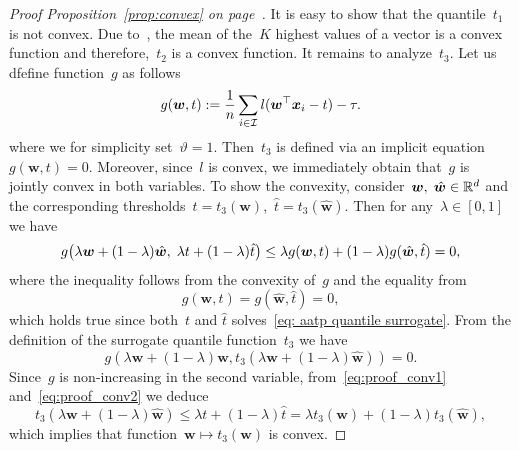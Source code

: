 \propconvex*
\begin{proof}[Proof Proposition~\ref{prop:convex} on page~\pageref{prop:convex}]
  It is easy to show that the quantile~$t_1$ is not convex. Due to~\cite{lapin2015top}, the mean of the~$K$ highest values of a vector is a convex function and therefore,~$t_2$ is a convex function. It remains to analyze~$t_3$. Let us dfefine function~$g$ as follows
  \begin{equation*}
    g(\bm{w},t) := \frac{1}{n} \sum_{i \in \mathcal{I}} l(\bm{w}^\top \bm{x}_i - t) - \tau.
  \end{equation*}
  where we for simplicity set~$\vartheta = 1.$ Then~$t_3$ is defined via an implicit equation~$g(\bm{w},t) = 0.$ Moreover, since~$l$ is convex, we immediately obtain that~$g$ is jointly convex in both variables. To show the convexity, consider~$\bm{w}, \; \hat{\bm{w}} \in \mathbb{R}^d$ and the corresponding thresholds~$t = t_3(\bm{w})$,~$\hat{t} = t_3(\hat{\bm{w}})$. Then for any~$\lambda\in[0,1]$ we have 
  \begin{equation}\label{eq:proof_conv1}
    g\Brac{\lambda \bm{w} + (1 - \lambda)\hat{\bm{w}}, \;\lambda t + (1 - \lambda)\hat{t}}
    \le \lambda g(\bm{w}, t) + (1 - \lambda) g(\hat{\bm{w}}, \hat{t}) = 0,
  \end{equation}
  where the inequality follows from the convexity of~$g$ and the equality from
  \begin{equation*}
    g(\bm{w}, t) = g(\hat{\bm{w}}, \hat{t}) = 0,
  \end{equation*}
  which holds true since both~$t$ and $\hat{t}$ solves~\eqref{eq: aatp quantile surrogate}. From the definition of the surrogate quantile function~$t_3$ we have
  \begin{equation}\label{eq:proof_conv2}
    g(\lambda\bm{w} + (1-\lambda)\hat{\bm{w}}, t_3(\lambda\bm{w} + (1-\lambda)\hat{\bm{w}})) = 0.
  \end{equation}
  Since~$g$ is non-increasing in the second variable, from~\eqref{eq:proof_conv1} and~\eqref{eq:proof_conv2} we deduce
  \begin{equation*}
    t_3(\lambda\bm{w} + (1-\lambda)\hat{\bm{w}})
    \le \lambda t + (1-\lambda)\hat{t}
    =   \lambda t_3(\bm{w})+(1-\lambda) t_3(\hat{\bm{w}}),
  \end{equation*}
  which implies that function~$\bm{w}\mapsto t_3(\bm{w})$ is convex.
\end{proof}

